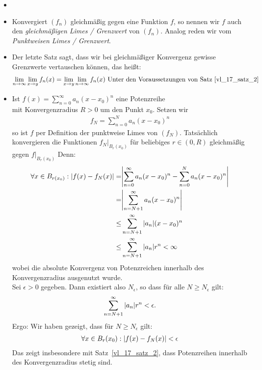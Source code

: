 
\begin{Bemerkung}{
	\begin{itemize}
		\item[ ]
		\item Konvergiert $(f_n)$ gleichmäßig gegen eine Funktion $f$, 
		so nennen wir $f$ auch den \emph{gleichmäßigen Limes / Grenzwert} 
		von $(f_n)$. Analog reden wir vom \emph{Punktweisen Limes / Grenzwert}.
		\item Der letzte Satz sagt, dass wir bei gleichmäßiger Konvergenz gewisse 
		Grenzwerte vertauschen können, das heißt:
		\begin{align*}
			\lim\limits_{n\rightarrow \infty}{\lim\limits_{x \rightarrow y}{f_n(x)}} = \lim\limits_{x \rightarrow y}{\lim\limits_{n \rightarrow \infty}
			{f_n(x)}}
			\text{ Unter den Voraussetzungen von Satz~\ref{vl_17_satz_2}}
		\end{align*}
		\item Ist $f(x) = \sum_{n = 0}^{\infty} a_n (x-x_0)^n$ eine Potenzreihe \\
		mit Konvergenzradius $R > 0$ um den Punkt $x_0$. Setzen wir 
		\begin{align*}
			f_N = \sum_{n = 0}^N a_n (x-x_0)^n
		\end{align*}
		so ist $f$ per Definition der punktweise Limes von $(f_N)$.
		Tatsächlich konvergieren die Funktionen $f_N\vert_{B_r(x_0)}$ für 
		beliebiges $r \in (0,R)$ gleichmäßig gegen $f\vert_{B_r(x_0)}$ 
		Denn:
		\begin{align*}
			\forall x \in B_{r (x_0)} : \abs{f(x)- f_N(x) } 
			=&\abs{ \sum_{n=0}^{\infty} a_n (x-x_0)^n - \sum_{n=0}^N a_n (x-x_0)^n} \\
			= & \abs{\sum_{n = N+1 }^{\infty} a_n (x-x_0)^n} \\
			\leq & \sum_{n = N+1}^{\infty} \abs{a_n}(x-x_0)^n \\
			\leq & \sum_{n = N +1}^{\infty} \abs{a_n} r^n < \infty
		\end{align*}
		wobei die absolute Konvergenz von Potenzreichen innerhalb des 
		Konvergenzradius ausgenutzt wurde. \\
		Sei $\epsilon > 0$ gegeben. Dann existiert also $N_{\epsilon}$, so dass 
		für alle $N \geq N_{\epsilon}$ gilt:
		\begin{align*}
			\sum_{n = N+1}^{\infty}\abs{a_n}r^n < \epsilon.
		\end{align*}
		Ergo: Wir haben gezeigt, dass für $N \geq N_{\epsilon}$ gilt:
		\begin{align*}
			\forall x \in B_r(x_0) : \abs{f(x) - f_N(x)} < \epsilon
		\end{align*}
		Das zeigt insbesondere mit Satz~\ref{vl_17_satz_2},
		 dass Potenzreihen innerhalb des Konvergenzradius stetig sind.
	\end{itemize}
}\end{Bemerkung}

